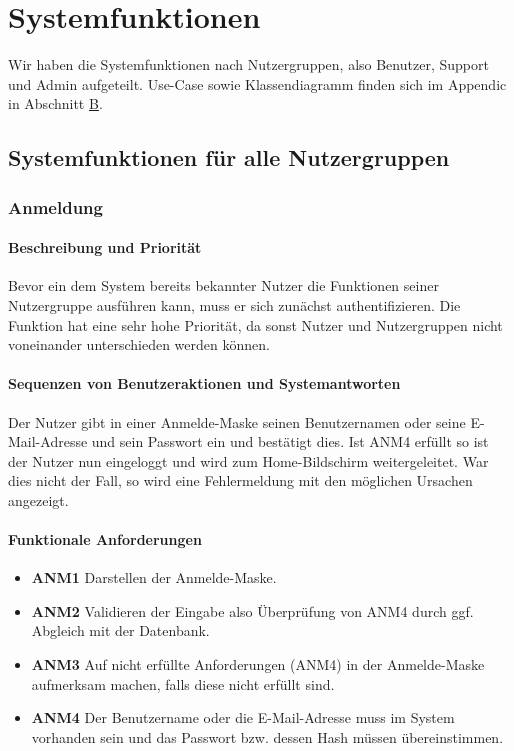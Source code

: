 \section{Systemfunktionen}
\label{system_features}

Wir haben die Systemfunktionen nach Nutzergruppen, also Benutzer, Support und Admin aufgeteilt. Use-Case sowie Klassendiagramm finden sich im Appendic in Abschnitt \hyperref[sec:app_modelle]{B}.

\subsection{Systemfunktionen für alle Nutzergruppen}
\subsubsection{Anmeldung}
\paragraph{Beschreibung und Priorität}

Bevor ein dem System bereits bekannter Nutzer die Funktionen seiner Nutzergruppe ausführen kann,
muss er sich zunächst authentifizieren.
Die Funktion hat eine sehr hohe Priorität, da sonst Nutzer und Nutzergruppen nicht voneinander unterschieden werden können.

\paragraph{Sequenzen von Benutzeraktionen und Systemantworten}

Der Nutzer gibt in einer Anmelde-Maske seinen Benutzernamen oder seine E-Mail-Adresse und sein Passwort ein
und bestätigt dies.
Ist ANM4 erfüllt so ist der Nutzer nun eingeloggt und wird zum Home-Bildschirm weitergeleitet.
War dies nicht der Fall, so wird eine Fehlermeldung mit den möglichen Ursachen angezeigt.

\paragraph{Funktionale Anforderungen}
\begin{itemize}
	\item \textbf{ANM1} Darstellen der Anmelde-Maske.
	\item \textbf{ANM2} Validieren der Eingabe also Überprüfung von ANM4 durch ggf. Abgleich mit der Datenbank.
	\item \textbf{ANM3} Auf nicht erfüllte Anforderungen (ANM4) in der Anmelde-Maske aufmerksam machen,
	      falls diese nicht erfüllt sind.
	\item \textbf{ANM4} Der Benutzername oder die E-Mail-Adresse muss im System vorhanden sein und das Passwort
	      bzw. dessen Hash müssen übereinstimmen.
\end{itemize}


